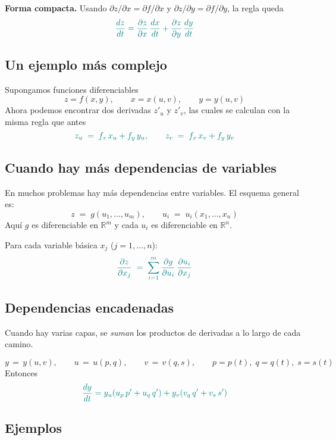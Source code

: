 \documentclass{article}
\begin{document}
\textbf{Forma compacta.} Usando \(\partial z/\partial x=\partial f/\partial x\) y
\(\partial z/\partial y=\partial f/\partial y\), la regla queda
\[\color{teal}
{\;\frac{dz}{dt}
= \frac{\partial z}{\partial x}\,\frac{dx}{dt}
+ \frac{\partial z}{\partial y}\,\frac{dy}{dt}\;}
\]


\subsection*{Un ejemplo más complejo}




Supongamos funciones diferenciables
\[
z = f(x,y), \qquad x = x(u,v), \qquad y = y(u,v)
\]
Ahora podemos encontrar dos derivadas $z'_u$ y $z'_v$, las cuales se calculan con la misma regla que antes
\[\color{teal}{\,z_u \;=\; f_x\,x_u + f_y\,y_u, \qquad
z_v \;=\; f_x\,x_v + f_y\,y_v\, }
\]


\subsection*{Cuando hay más dependencias de variables}

En muchos problemas hay más dependencias entre variables. El esquema general es:
\[
z \;=\; g(u_1,\dots,u_m),
\qquad
u_i \;=\; u_i(x_1,\dots,x_n)
\]
Aquí \(g\) es diferenciable en \(\mathbb{R}^m\) y cada \(u_i\) es diferenciable en \(\mathbb{R}^n\).

Para cada variable básica \(x_j\) (\(j=1,\dots,n\)):
\[
\color{teal}
\frac{\partial z}{\partial x_j}
\;=\;\sum_{i=1}^m \frac{\partial g}{\partial u_i}\,\frac{\partial u_i}{\partial x_j}
\]


\subsection*{Dependencias encadenadas}
Cuando hay varias capas, se \emph{suman} los productos de derivadas a lo largo de cada camino.

\medskip
\[
y\,=\,y(u,v),\qquad
u\,=\,u(p,q),\qquad
v\,=\,v(q,s),\qquad
p=p(t),\; q=q(t),\; s=s(t)
\]
Entonces
\[
\color{teal}
\frac{dy}{dt}
= y_u\!\left(u_p\,p' + u_q\,q'\right)
+ y_v\!\left(v_q\,q' + v_s\,s'\right)
\]






\subsection*{Ejemplos}
\end{document}

